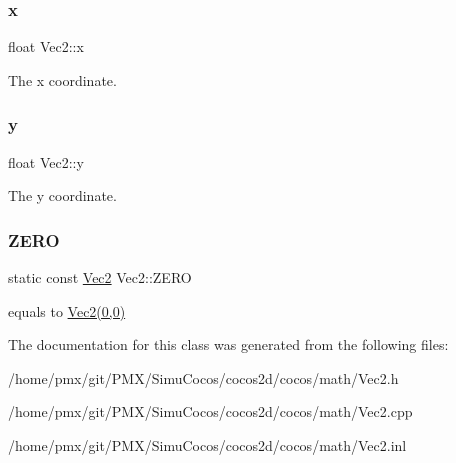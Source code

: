\subsubsection{\texorpdfstring{x}{x}}
{\footnotesize\ttfamily float Vec2\+::x}

The x coordinate. \mbox{\label{classVec2_a30543787e62f6d915543cf1dfb04c094}} 
\subsubsection{\texorpdfstring{y}{y}}
{\footnotesize\ttfamily float Vec2\+::y}

The y coordinate. \mbox{\label{classVec2_a5c80e2e7c8bd2adcbad2844d060e6245}} 
\subsubsection{\texorpdfstring{Z\+E\+RO}{ZERO}}
{\footnotesize\ttfamily static const \hyperlink{classVec2}{Vec2} Vec2\+::\+Z\+E\+RO\hspace{0.3cm}{\ttfamily [static]}}

equals to \hyperlink{classVec2}{Vec2(0,0)} 

The documentation for this class was generated from the following files\+:\begin{DoxyCompactItemize}
\item 
/home/pmx/git/\+P\+M\+X/\+Simu\+Cocos/cocos2d/cocos/math/Vec2.\+h\item 
/home/pmx/git/\+P\+M\+X/\+Simu\+Cocos/cocos2d/cocos/math/Vec2.\+cpp\item 
/home/pmx/git/\+P\+M\+X/\+Simu\+Cocos/cocos2d/cocos/math/Vec2.\+inl\end{DoxyCompactItemize}
